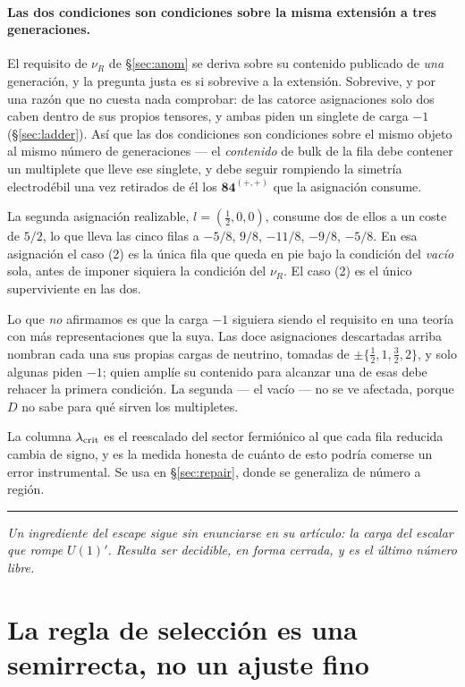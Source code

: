 \documentclass[11pt,a4paper]{article}
\newcommand{\rep}[1]{\mathbf{#1}}
\newcommand{\bridge}[1]{\par\medskip\noindent
  \textcolor{hdrblue!45}{\rule{2.2cm}{0.6pt}}\;\;\parbox[t]{0.84\textwidth}{\small\itshape
  \textcolor{hdrblue!85}{#1}}\par\medskip}
\begin{document}
\paragraph{Las dos condiciones son condiciones sobre la misma extensión a tres generaciones.} El
requisito de $\nu_R$ de \S\ref{sec:anom} se deriva sobre su contenido publicado de \emph{una}
generación, y la pregunta justa es si sobrevive a la extensión. Sobrevive, y por una razón que no
cuesta nada comprobar: de las catorce asignaciones solo dos caben dentro de sus propios tensores, y
ambas piden un singlete de carga $-1$ (\S\ref{sec:ladder}). Así que las dos condiciones son
condiciones sobre el mismo objeto al mismo número de generaciones --- el \emph{contenido} de bulk de
la fila debe contener un multiplete que lleve ese singlete, y debe seguir rompiendo la simetría
electrodébil una vez retirados de él los $\rep{84}^{(+,+)}$ que la asignación consume.

La segunda asignación realizable, $l=(\tfrac12,0,0)$, consume dos de ellos a un coste de $5/2$, lo
que lleva las cinco filas a $-5/8$, $9/8$, $-11/8$, $-9/8$, $-5/8$. En esa asignación el caso (2) es
la única fila que queda en pie bajo la condición del \emph{vacío} sola, antes de imponer siquiera la
condición del $\nu_R$. El caso (2) es el único superviviente en las dos.

Lo que \emph{no} afirmamos es que la carga $-1$ siguiera siendo el requisito en una teoría con más
representaciones que la suya. Las doce asignaciones descartadas arriba nombran cada una sus propias
cargas de neutrino, tomadas de $\pm\{\tfrac12,1,\tfrac32,2\}$, y solo algunas piden $-1$; quien
amplíe su contenido para alcanzar una de esas debe rehacer la primera condición. La segunda
--- el vacío --- no se ve afectada, porque $D$ no sabe para qué sirven los multipletes.

La columna $\lambda_{\rm crit}$ es el reescalado del sector fermiónico al que cada fila reducida
cambia de signo, y es la medida honesta de cuánto de esto podría comerse un error instrumental. Se
usa en \S\ref{sec:repair}, donde se generaliza de número a región.

\bridge{Un ingrediente del escape sigue sin enunciarse en su artículo: la carga del escalar que rompe
$U(1)'$. Resulta ser decidible, en forma cerrada, y es el último número libre.}

\section{La regla de selección es una semirrecta, no un ajuste fino}\label{sec:qphi}
\end{document}

